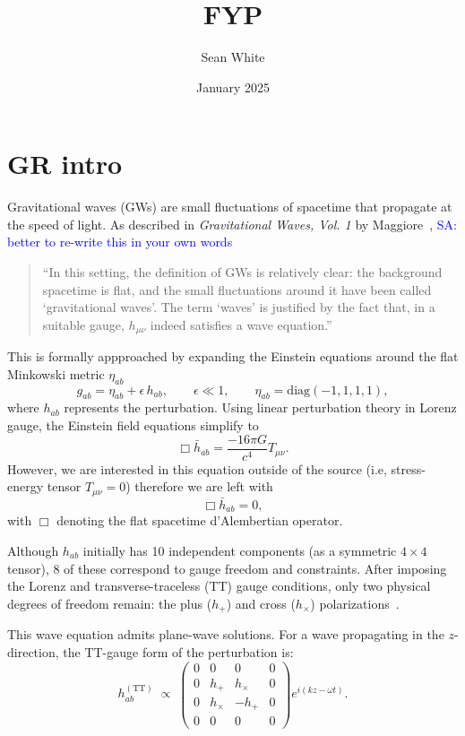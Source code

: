 \documentclass{article}
\title{FYP }
\author{Sean White}
\date{January 2025}
\newcommand{\Sarp}[1]{{\textcolor{blue}{{SA: #1}} }}
\begin{document}
\maketitle

\section{GR intro}


Gravitational waves (GWs) are small fluctuations of spacetime that propagate at the speed of light. As described in \textit{Gravitational Waves, Vol. 1} by Maggiore~\cite[p.~29]{GRbook},
\Sarp{better to re-write this in your own words}
\begin{quote}
“In this setting, the definition of GWs is relatively clear: the background spacetime is flat, and the small fluctuations around it have been called ‘gravitational waves’. The term ‘waves’ is justified by the fact that, in a suitable gauge, \(h_{\mu\nu}\) indeed satisfies a wave equation.”
\end{quote}
This is formally appproached by expanding the Einstein equations around the flat Minkowski metric $\eta _{a b}$ 
\begin{equation}
g_{ab} = \eta_{ab} + \epsilon\,h_{ab},
\qquad
\epsilon \ll 1,
\qquad
\eta_{ab} = \mathrm{diag}(-1, 1, 1, 1),
\end{equation}
where \(h_{ab}\) represents the perturbation. Using linear perturbation theory in Lorenz gauge, the Einstein field equations simplify to
\begin{equation}
    \Box \bar{h}_{ab} = \frac{-16\pi G}{c^4} T_{\mu \nu}.
\end{equation}
However, we are interested in this equation outside of the source (i.e, stress-energy tensor $T_{\mu \nu} =0$) therefore we are left with 
\begin{equation}
    \Box \bar{h}_{ab} = 0, 
\end{equation}
with \(\Box\) denoting the flat spacetime d’Alembertian operator.

\noindent
Although \(h_{ab}\) initially has 10 independent components (as a symmetric $4 \times 4$ tensor), 8 of these correspond to gauge freedom and constraints. After imposing the Lorenz and transverse-traceless (TT) gauge conditions, only two physical degrees of freedom remain: the plus (\(h_+\)) and cross (\(h_\times\)) polarizations~\cite[Sec.~1.2]{GRbook}.

\noindent
This wave equation admits plane-wave solutions. For a wave propagating in the \(z\)-direction, the TT-gauge form of the perturbation is:
\begin{equation}
h_{ab}^{(\mathrm{TT})} \;\propto\;
\begin{pmatrix}
0 & 0 & 0 & 0 \\
0 & h_+ & h_\times & 0 \\
0 & h_\times & -h_+ & 0 \\
0 & 0 & 0 & 0
\end{pmatrix}
e^{i(kz-\omega t)}.
\end{equation}
\end{document}
